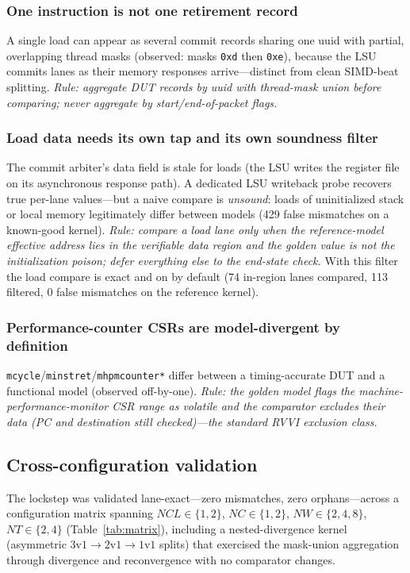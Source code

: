 \documentclass[conference]{IEEEtran}
\newcommand{\code}[1]{\texttt{\small #1}}
\begin{document}
\subsubsection{One instruction is not one retirement record}
A single load can appear as several commit records sharing one uuid
with partial, overlapping thread masks (observed: masks \code{0xd} then
\code{0xe}), because the LSU commits lanes as their memory responses
arrive---distinct from clean SIMD-beat splitting. \emph{Rule: aggregate
DUT records by uuid with thread-mask union before comparing; never
aggregate by start/end-of-packet flags.}

\subsubsection{Load data needs its own tap and its own soundness
filter}
The commit arbiter's data field is stale for loads (the LSU writes the
register file on its asynchronous response path). A dedicated LSU
writeback probe recovers true per-lane values---but a naive compare is
\emph{unsound}: loads of uninitialized stack or local memory
legitimately differ between models (429 false mismatches on a known-good
kernel). \emph{Rule: compare a load lane only when the reference-model
effective address lies in the verifiable data region and the golden
value is not the initialization poison; defer everything else to the
end-state check.} With this filter the load compare is exact and on by
default (74 in-region lanes compared, 113 filtered, 0 false mismatches
on the reference kernel).

\subsubsection{Performance-counter CSRs are model-divergent by
definition}
\code{mcycle}/\code{minstret}/\code{mhpmcounter*} differ between a
timing-accurate DUT and a functional model (observed off-by-one).
\emph{Rule: the golden model flags the machine-performance-monitor CSR
range as volatile and the comparator excludes their data (PC and
destination still checked)---the standard RVVI exclusion class.}

\subsection{Cross-configuration validation}
The lockstep was validated lane-exact---zero mismatches, zero
orphans---across a configuration matrix spanning
$\textit{NCL}\in\{1,2\}$, $\textit{NC}\in\{1,2\}$,
$\textit{NW}\in\{2,4,8\}$, $\textit{NT}\in\{2,4\}$
(Table~\ref{tab:matrix}), including a nested-divergence kernel
(asymmetric $3\text{v}1 \to 2\text{v}1 \to 1\text{v}1$ splits) that
exercised the mask-union aggregation through divergence and
reconvergence with no comparator changes.
\end{document}
